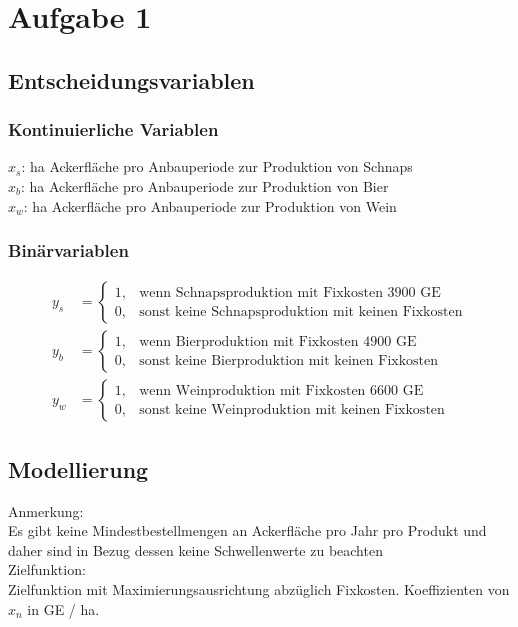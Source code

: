 \documentclass[a4paper,11pt]{article}
\begin{document}
\raggedright %

\section*{Aufgabe 1}

\subsection*{Entscheidungsvariablen} 
\subsubsection*{Kontinuierliche Variablen}
$x_{s}$: ha Ackerfläche pro Anbauperiode zur Produktion von Schnaps\\
$x_{b}$: ha Ackerfläche pro Anbauperiode zur Produktion von Bier \\
$x_{w}$: ha Ackerfläche pro Anbauperiode zur Produktion von Wein \\
\bigbreak

\subsubsection*{Binärvariablen}
\begin{align*}
y_s &= \begin{cases}
    1, & \text{wenn Schnapsproduktion mit Fixkosten 3900 GE} \\
    0, & \text{sonst keine Schnapsproduktion mit keinen Fixkosten}
\end{cases} \\
y_b &= \begin{cases}
    1, & \text{wenn Bierproduktion mit Fixkosten 4900 GE} \\
    0, & \text{sonst keine Bierproduktion mit keinen Fixkosten}
\end{cases} \\
y_w &= \begin{cases}
    1, & \text{wenn Weinproduktion mit Fixkosten 6600 GE} \\
    0, & \text{sonst keine Weinproduktion mit keinen Fixkosten}
\end{cases}
\end{align*}

\subsection*{Modellierung}
Anmerkung: \\
Es gibt keine Mindestbestellmengen an Ackerfläche pro Jahr pro Produkt und daher sind in Bezug dessen keine Schwellenwerte zu beachten \\
\bigbreak
Zielfunktion: \\
Zielfunktion mit Maximierungsausrichtung abzüglich Fixkosten. Koeffizienten von $x_n$ in GE / ha.
\end{document}
